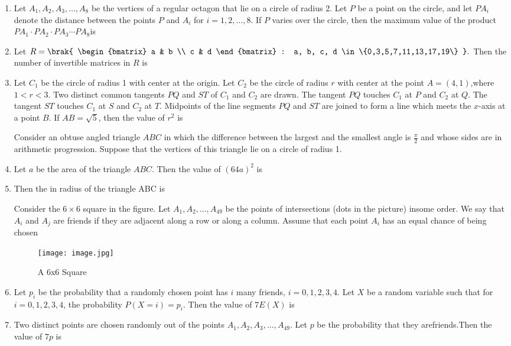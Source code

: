 \documentclass[12pt,a4paper]{article}
\begin{document}
\begin{enumerate}
\item Let $A_1, A_2, A_3, \dots, A_8$ be the vertices of a regular octagon that lie on a circle of radius 2. Let $P$ be a point on the circle, and let $PA_i$ denote the distance between the points $P$ and $A_i$ for $i = 1,2, \dots, 8$. If $P$ varies over the circle, then the maximum value of the product $PA_1 \cdot PA_2 \cdot PA_3 \cdots PA_8$is

\item Let $R = \brak{ \begin{bmatrix} a & b \\ c & d \end{bmatrix} : a, b, c, d \in \{0,3,5,7,11,13,17,19\} }.$
Then the number of invertible matrices in $R$ is


\item Let $C_1$ be the circle of radius 1 with center at the origin. Let $C_2$ be the circle of radius $r$ with center at the point $A = (4,1)$,where $1 < r < 3$. Two distinct common tangents $PQ$ and $ST$ of $C_1$ and $C_2$ are drawn. The tangent $PQ$ touches $C_1$ at $P$ and $C_2$ at $Q$. The tangent $ST$ touches $C_1$ at $S$ and $C_2$ at $T$. Midpoints of the line segments $PQ$ and $ST$ are joined to form a line which meets the $x$-axis at a point $B$. If $AB = \sqrt{5}$, then the value of $r^2$ is



\noindent Consider an obtuse angled triangle $ABC$ in which the difference between the largest and the smallest angle is $\frac{\pi}{2}$ and whose sides are in arithmetic progression. Suppose that the vertices of this triangle lie on a circle of radius 1.

\item Let $a$ be the area of the triangle $ABC$. Then the value of $(64a)^2$ is

\item Then the in radius of the triangle ABC is


\noindent Consider the $6 \times 6$ square in the figure. Let $A_1, A_2, \ldots, A_{49}$ be the points of intersections (dots in the picture) insome order. We say that $A_i$ and $A_j$ are friends if they are adjacent along a row or along a column. Assume that each point $A_i$ has an equal chance of being chosen


\begin{figure}[h]
    \centering
	\texttt{[image: image.jpg]}
    \caption{A 6x6 Square}
    \label{fig:Square}
\end{figure}


\item Let $p_i$ be the probability that a randomly chosen point has $i$ many friends, $i = 0, 1, 2, 3, 4$. Let $X$ be a random variable such that for $i = 0, 1, 2, 3, 4$, the probability $P(X = i) = p_i$. Then the value of $7E(X)$ is


\item Two distinct points are chosen randomly out of the points $A_1, A_2, A_3, \dots, A_{49}$.
Let $p$ be the probability that they arefriends.Then the value of $7p$ is

\end{enumerate}
\end{document}
